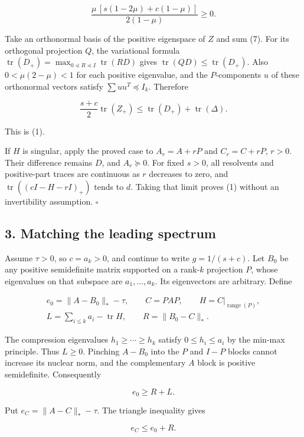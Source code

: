 \documentclass[10pt,a4paper]{article}
\begin{document}
\[
\frac{\mu\,[s(1-2\mu)+c(1-\mu)]}{2(1-\mu)}\ge0.
\]

Take an orthonormal basis of the positive eigenspace of \(Z\) and sum
(7). For its orthogonal projection \(Q\), the variational formula
\(\operatorname{tr}(D_+)=\max_{0\preceq R\preceq I}\operatorname{tr}(RD)\)
gives \(\operatorname{tr}(QD)\le\operatorname{tr}(D_+)\). Also
\(0<\mu(2-\mu)<1\) for each positive eigenvalue, and the
\(P\)-components \(u\) of these orthonormal vectors satisfy
\(\sum uu^T\preceq I_k\). Therefore

\[
\frac{s+c}{2}\operatorname{tr}(Z_+)
\le\operatorname{tr}(D_+)+\operatorname{tr}(\Delta).
\]

This is (1).

If \(H\) is singular, apply the proved case to \(A_r=A+rP\) and
\(C_r=C+rP\), \(r>0\). Their difference remains \(D\), and
\(A_r\succeq0\). For fixed \(s>0\), all resolvents and positive-part
traces are continuous as \(r\) decreases to zero, and
\(\operatorname{tr}((cI-H-rI)_+)\) tends to \(d\). Taking that limit
proves (1) without an invertibility assumption. \(\square\)

\subsection{3. Matching the leading
spectrum}\label{matching-the-leading-spectrum}

Assume \(\tau>0\), so \(c=a_k>0\), and continue to write \(g=1/(s+c)\).
Let \(B_0\) be any positive semidefinite matrix supported on a
rank-\(k\) projection \(P\), whose eigenvalues on that subspace are
\(a_1,\ldots,a_k\). Its eigenvectors are arbitrary. Define

\[
\begin{gathered}
e_0=\|A-B_0\|_*-\tau,\qquad C=PAP,\qquad
H=C\big|_{\operatorname{range}(P)},\\
L=\sum_{i\le k}a_i-\operatorname{tr}H,\qquad
R=\|B_0-C\|_*.
\end{gathered}
\]

The compression eigenvalues \(h_1\ge\cdots\ge h_k\) satisfy
\(0\le h_i\le a_i\) by the min-max principle. Thus \(L\ge0\). Pinching
\(A-B_0\) into the \(P\) and \(I-P\) blocks cannot increase its nuclear
norm, and the complementary \(A\) block is positive semidefinite.
Consequently

\[
e_0\ge R+L.\tag{8}
\]

Put \(e_C=\|A-C\|_*-\tau\). The triangle inequality gives

\[
e_C\le e_0+R.\tag{9}
\]
\end{document}
